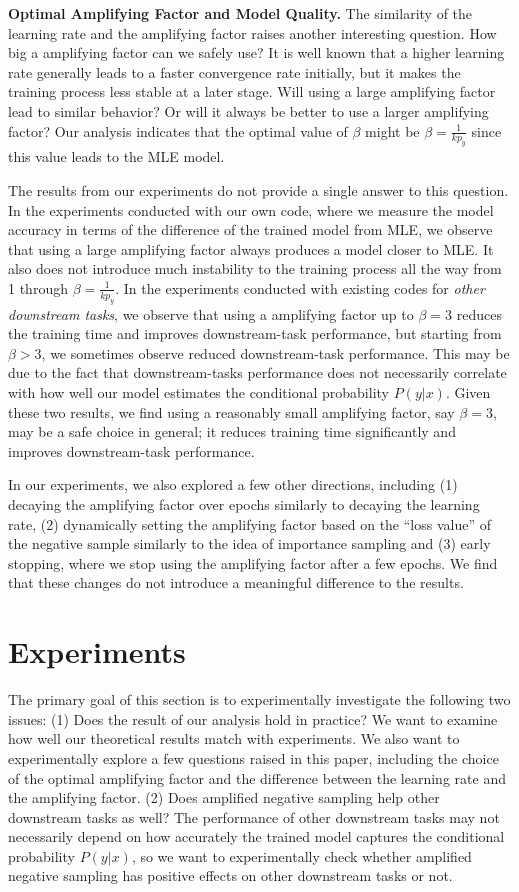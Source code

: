 \textbf{Optimal Amplifying Factor and Model Quality.} The similarity of the learning rate and the amplifying factor raises another interesting question. How big a amplifying factor can we safely use? It is well known that a higher learning rate generally leads to a faster convergence rate initially, but it makes the training process less stable at a later stage. Will using a large amplifying factor lead to similar behavior? Or will it always be better to use a larger amplifying factor? Our analysis indicates that the optimal value of $\beta$ might be $\beta = \frac{1}{k p_y}$ since this value leads to the MLE model. 

The results from our experiments do not provide a single answer to this question. In the experiments conducted with our own code, where we measure the model accuracy in terms of the difference of the trained model from MLE, we observe that using a large amplifying factor always produces a model closer to MLE. It also does not introduce much instability to the training process all the way from 1 through $\beta = \frac{1}{k p_y}$. In the experiments conducted with existing codes for \emph{other downstream tasks}, we observe that using a amplifying factor up to $\beta = 3$ reduces the training time and improves downstream-task performance, but starting from $\beta > 3$, we sometimes observe reduced downstream-task performance. This may be due to the fact that downstream-tasks performance does not necessarily correlate with how well our model estimates the conditional probability $P(y|x)$. Given these two results, we find using a reasonably small amplifying factor, say $\beta = 3$, may be a safe choice in general; it reduces training time significantly and improves downstream-task performance.

In our experiments, we also explored a few other directions, including (1) decaying the amplifying factor over epochs similarly to decaying the learning rate, (2) dynamically setting the amplifying factor based on the ``loss value'' of the negative sample similarly to the idea of importance sampling and (3) early stopping, where we stop using the amplifying factor after a few epochs. We find that these changes do not introduce a meaningful difference to the results. 
\section{Experiments}
\label{sec:NS:exp}

The primary goal of this section is to experimentally investigate the following two issues: (1) Does the result of our analysis hold in practice? We want to examine how well our theoretical results match with experiments. We also want to experimentally explore a few questions raised in this paper, including the choice of the optimal amplifying factor and the difference between the learning rate and the amplifying factor. (2) Does amplified negative sampling help other downstream tasks as well? The performance of other downstream tasks may not necessarily depend on how accurately the trained model captures the conditional probability $P(y|x)$, so we want to experimentally check whether amplified negative sampling has positive effects on other downstream tasks or not. 

